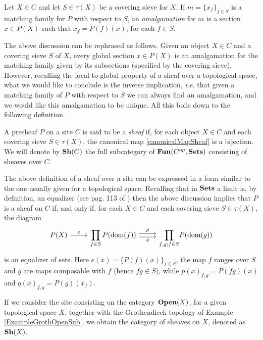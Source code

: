 \begin{defi}
	Let $X\in C$ and let $S\in \tau(X)$ be a covering sieve for $X$. If $m=\{x_f\}_{f\in S}$ is a matching family for $P$ with respect to $S$, an \textit{amalgamation} for $m$ is a section $x\in P(X)$ such that $x_f=P(f)(x)$, for each $f\in S$.
\end{defi}
The above discussion can be rephrased as follows. Given an object $X\in C$ and a covering sieve $S$ of $X$, every global section $x\in P(X)$ is an amalgamation for the matching family given by its subsections (specified by the covering sieve). However, recalling the local-to-global property of a sheaf over a topological space, what we would like to conclude is the inverse implication, \textit{i.e.} that given a matching family of $P$ with respect to $S$ we can always find an amalgamation, and we would like this amalgamation to be unique. All this boils down to the following definition. 
\begin{defi}
	A presheaf $P$ on a site $C$ is said to be a \textit{sheaf} if, for each object $X\in C$ and each covering sieve $S\in \tau(X)$, the canonical map \ref{canonicalMapSheaf} is a bijection. We will denote by ${\normalfont\textbf{Sh}}(C)$ the full subcategory of ${\normalfont\textbf{Fun}}(C^{op},{\normalfont\textbf{Sets}})$ consisting of sheaves over $C$.
\end{defi}
\begin{rem}
	The above definition of a sheaf over a site can be expressed in a form similar to the one usually given for a topological space. Recalling that in ${\normalfont\textbf{Sets}}$ a limit is, by definition, an equalizer (see pag. 113 of \cite{maclane2013categories}) then the above discussion implies that $P$ is a sheaf on $C$ if, and only if, for each $X\in C$ and each covering sieve $S\in \tau(X)$, the diagram
	\begin{equation*}
		\begin{tikzcd}[column sep=small]%
			P(X) \arrow[rr, "e"] &  & {\displaystyle\prod_{f\in S}P(\mbox{dom}(f))} \arrow[rr, "p", shift left] \arrow[rr, "q"', shift right] &  & {\displaystyle\prod_{f,g; f\in S}}P(\mbox{dom}(g))
		\end{tikzcd}
	\end{equation*}  
	is an equalizer of sets. Here $e(x)=\{P(f)(x)\}_{f\in S}$, the map $f$ ranges over $S$ and $g$ are maps composable with $f$ (hence $fg\in S$), while $p(x)_{f,g}=P(fg)(x)$ and $q(x)_{f,g}=P(g)(x_f)$.
\end{rem}
\begin{ex}
	If we consider the site consisting on the category ${\normalfont\textbf{Open}}(X)$, for a given topological space $X$, together with the Grothendieck topology of Example \ref{ExampleGrothOpenSub}, we obtain the category of sheaves on $X$, denoted as ${\normalfont\textbf{Sh}}(X)$.
\end{ex}
